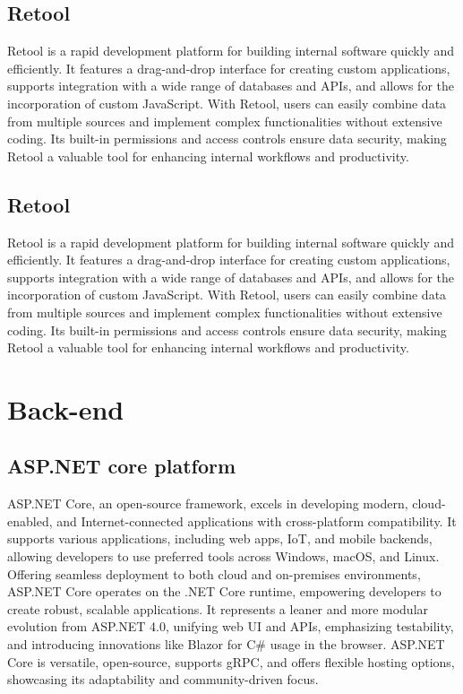 \subsection{Retool}
Retool is a rapid development platform for building internal software quickly and efficiently. It features a drag-and-drop interface for creating custom applications, supports integration with a wide range of databases and APIs, and allows for the incorporation of custom JavaScript. With Retool, users can easily combine data from multiple sources and implement complex functionalities without extensive coding. Its built-in permissions and access controls ensure data security, making Retool a valuable tool for enhancing internal workflows and productivity.

\subsection{Retool}

Retool is a rapid development platform for building internal software quickly and efficiently. It features a drag-and-drop interface for creating custom applications, supports integration with a wide range of databases and APIs, and allows for the incorporation of custom JavaScript. With Retool, users can easily combine data from multiple sources and implement complex functionalities without extensive coding. Its built-in permissions and access controls ensure data security, making Retool a valuable tool for enhancing internal workflows and productivity.

\section{Back-end}

\subsection{ASP.NET core platform}

ASP.NET Core, an open-source framework, excels in developing modern,
cloud-enabled, and Internet-connected applications with cross-platform
compatibility. It supports various applications, including web apps,
IoT, and mobile backends, allowing developers to use preferred tools
across Windows, macOS, and Linux. Offering seamless deployment to both
cloud and on-premises environments, ASP.NET Core operates on the .NET
Core runtime, empowering developers to create robust, scalable
applications. It represents a leaner and more modular evolution from
ASP.NET 4.0, unifying web UI and APIs, emphasizing testability, and
introducing innovations like Blazor for C\# usage in the browser.
ASP.NET Core is versatile, open-source, supports gRPC, and offers
flexible hosting options, showcasing its adaptability and
community-driven focus.

